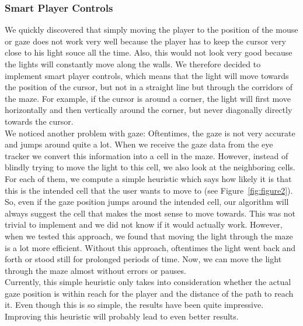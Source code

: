 \documentclass{sigchi}
\begin{document}
\subsubsection{Smart Player Controls} 
We quickly discovered that simply moving the player to the position of the mouse or gaze does not work very well because the player has to keep the cursor very close to his light souce all the time. Also, this would not look very good because the lights will constantly move along the walls. We therefore decided to implement smart player controls, which means that the light will move towards the position of the cursor, but not in a straight line but through the corridors of the maze. For example, if the cursor is around a corner, the light will first move horizontally and then vertically around the corner, but never diagonally directly towards the cursor. \\
We noticed another problem with gaze: Oftentimes, the gaze is not very accurate and jumps around quite a lot. When we receive the gaze data from the eye tracker we convert this information into a cell in the maze. However, instead of blindly trying to move the light to this cell, we also look at the neighboring cells. For each of them, we compute a simple heuristic which says how likely it is that this is the intended cell that the user wants to move to  (see Figure~\ref{fig:figure2}). So, even if the gaze position jumps around the intended cell, our algorithm will always suggest the cell that makes the most sense to move towards. This was not trivial to implement and we did not know if it would actually work. However, when we tested this approach, we found that moving the light through the maze is a lot more efficient. Without this approach, oftentimes the light went back and forth or stood still for prolonged periods of time. Now, we can move the light through the maze almost without errors or pauses.\\
Currently, this simple heuristic only takes into consideration whether the actual gaze position is within reach for the player and the distance of the path to reach it. Even though this is so simple, the results have been quite impressive. Improving this heuristic will probably lead to even better results.
\end{document}
